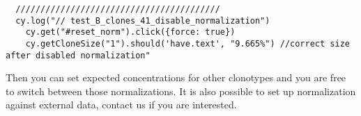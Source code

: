 \begin{verbatim}
  /////////////////////////////////////////
  cy.log("// test_B_clones_41_disable_normalization")
    cy.get("#reset_norm").click({force: true})
    cy.getCloneSize("1").should('have.text', "9.665%") //correct size after disabled normalization"

\end{verbatim}

Then you can set expected concentrations for other clonotypes and you are free to
switch between those normalizations.
It is also possible to set up normalization against external data,
contact us if you are interested.

